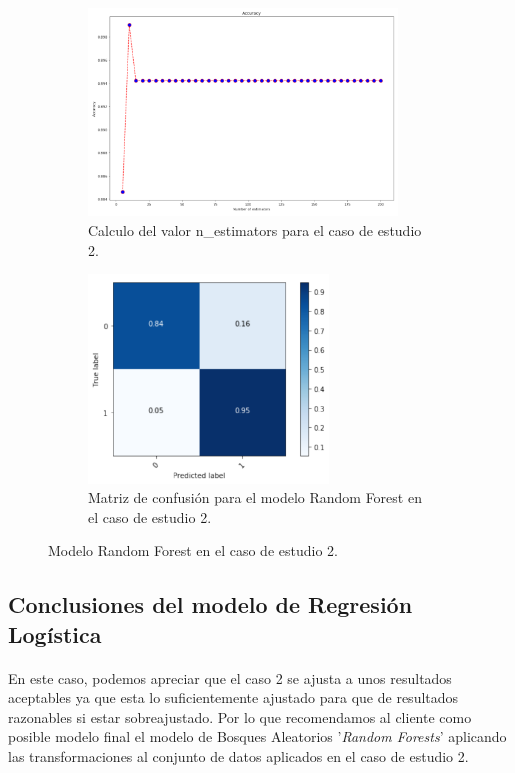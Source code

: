 \begin{figure}[!htb]
    \begin{subfigure}[b]{0.45\linewidth}
    	\centering
	    \includegraphics[width=0.9\textwidth]{images/resultados_rf_ent_conjunto2.png}
    	\caption{Calculo del valor n\_estimators para el caso de estudio 2.}
		\label{rfTrainCase2}
	\end{subfigure}
	\begin{subfigure}[b]{0.45\linewidth} 
		\centering
		\includegraphics[width=0.7\textwidth]{images/resultados_rf_cm_conjunto2.png}
		\caption{Matriz de confusión para el modelo Random Forest en el caso de estudio 2.}
		\label{rfCMCase2}
	\end{subfigure}
	\caption{Modelo Random Forest en el caso de estudio 2.}
	\label{rfCase2}
\end{figure}

\subsection{Conclusiones del modelo de Regresión Logística}
\label{resultados:rf_conclusiones}

\paragraph{}
En este caso, podemos apreciar que el caso 2 se ajusta a unos resultados aceptables ya que esta lo suficientemente ajustado para que de resultados razonables si estar sobreajustado\cite{ref:knn_overfiting}. Por lo que recomendamos al cliente como posible modelo final el modelo de Bosques Aleatorios '\textit{Random Forests}' aplicando las transformaciones al conjunto de datos aplicados en el caso de estudio 2.
